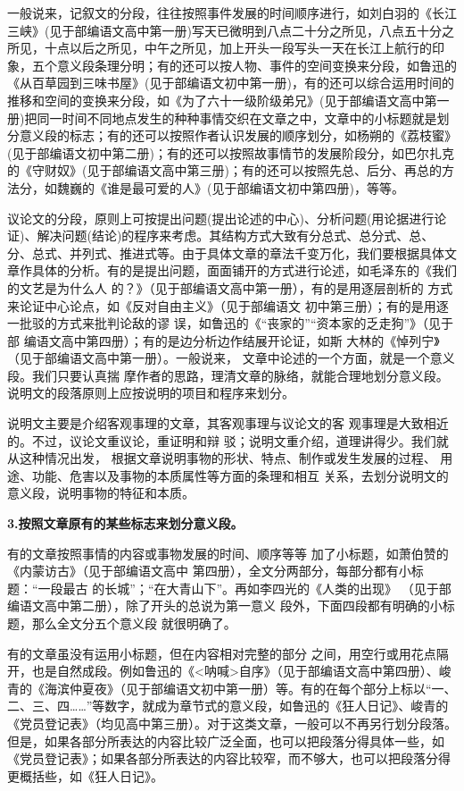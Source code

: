 一般说来，记叙文的分段，往往按照事件发展的时间顺序进行，如刘白羽的《长江三峡》(见于部编语文高中第一册)写天已微明到八点二十分之所见，八点五十分之所见，十点以后之所见，中午之所见，加上开头一段写头一天在长江上航行的印象，五个意义段条理分明；有的还可以按人物、事件的空间变换来分段，如鲁迅的《从百草园到三味书屋》(见于部编语文初中第一册)，有的还可以综合运用时间的推移和空间的变换来分段，如《为了六十一级阶级弟兄》(见于部编语文高中第一册)把同一时间不同地点发生的种种事情交织在文章之中，文章中的小标题就是划分意义段的标志；有的还可以按照作者认识发展的顺序划分，如杨朔的《荔枝蜜》(见于部编语文初中第二册)；有的还可以按照故事情节的发展阶段分，如巴尔扎克的《守财奴》(见于部编语文高中第三册)；有的还可以按照先总、后分、再总的方法分，如魏巍的《谁是最可爱的人》(见于部编语文初中第四册)，等等。

议论文的分段，原则上可按提出问题(提出论述的中心)、分析问题(用论据进行论证)、解决问题(结论)的程序来考虑。其结构方式大致有分总式、总分式、总、分、总式、并列式、推进式等。由于具体文章的章法千变万化，我们要根据具体文章作具体的分析。有的是提出问题，面面铺开的方式进行论述，如毛泽东的《我们的文艺是为什么人 的？》（见于部编语文高中第一册），有的是用逐层剖析的 方式来论证中心论点，如《反对自由主义》（见于部编语文 初中第三册）；有的是用逐一批驳的方式来批判论敌的谬 误，如鲁迅的《“丧家的”“资本家的乏走狗”》（见于部 编语文高中第四册）；有的是边分析边作结展开论证，如斯 大林的《悼列宁》（见于部编语文高中第一册）。一般说来， 文章中论述的一个方面，就是一个意义段。我们只要认真揣 摩作者的思路，理清文章的脉络，就能合理地划分意义段。 说明文的段落原则上应按说明的项目和程序来划分。

说明文主要是介绍客观事理的文章，其客观事理与议论文的客 观事理是大致相近的。不过，议论文重议论，重证明和辩 驳；说明文重介绍，道理讲得少。我们就从这种情况出发， 根据文章说明事物的形状、特点、制作或发生发展的过程、 用途、功能、危害以及事物的本质属性等方面的条理和相互 关系，去划分说明文的意义段，说明事物的特征和本质。

\textbf{3.按照文章原有的某些标志来划分意义段。}

有的文章按照事情的内容或事物发展的时间、顺序等等 加了小标题，如萧伯赞的《内蒙访古》（见于部编语文高中 第四册），全文分两部分，每部分都有小标题：“一段最古 的长城”；“在大青山下”。再如李四光的《人类的出现》 （见于部编语文高中第二册），除了开头的总说为第一意义 段外，下面四段都有明确的小标题，那么全文分五个意义段 就很明确了。

有的文章虽没有运用小标题，但在内容相对完整的部分 之间，用空行或用花点隔开，也是自然成段。例如鲁迅的《<呐喊>自序》（见于部编语文高中第四册）、峻青的《海滨仲夏夜》（见于部编语文初中第一册）等。有的在每个部分上标以“一、二、三、四……”等数字，就成为章节式的意义段，如鲁迅的《狂人日记》、峻青的《党员登记表》（均见高中第三册）。对于这类文章，一般可以不再另行划分段落。但是，如果各部分所表达的内容比较广泛全面，也可以把段落分得具体一些，如《党员登记表》；如果各部分所表达的内容比较窄，而不够大，也可以把段落分得更概括些，如《狂人日记》。

